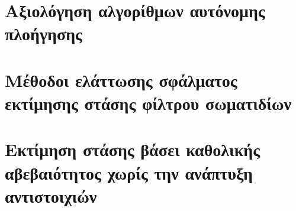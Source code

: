 \chapter{Αξιολόγηση αλγορίθμων αυτόνομης πλοήγησης}
  \label{part:02:chapter:01}
  

\chapter{Μέθοδοι ελάττωσης σφάλματος εκτίμησης στάσης φίλτρου σωματιδίων}
  \label{part:02:chapter:02}
  

\chapter{Εκτίμηση στάσης βάσει καθολικής αβεβαιότητος χωρίς την ανάπτυξη αντιστοιχιών}
  \label{part:02:chapter:03}
  

